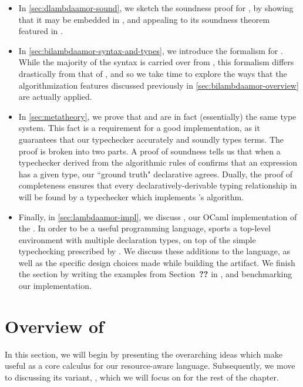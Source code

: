 \begin{itemize}
  \item In \autoref{sec:dlambdaamor-sound}, we sketch the soundness proof for \dlambdaamor, by showing that it may be embedded in \lambdaamor, and appealing to its soundness theorem featured in \citet{rajani-et-al:popl21}.
 
 \item In \autoref{sec:bilambdaamor-syntax-and-types}, we introduce the formalism for \bilambdaamor. While the majority of the syntax is carried over from \dlambdaamor, this formalism differs drastically from that of \dlambdaamor, and so we take time to explore the ways that the algorithmization features discussed previously in \autoref{sec:bilambdaamor-overview} are actually applied.
 
 \item In \autoref{sec:metatheory}, we prove that \bilambdaamor and \dlambdaamor are in fact (essentially) the same type system. This fact is a requirement for a good implementation, as it guarantees that our typechecker accurately and soundly types terms. The proof is broken into two parts. A proof of soundness tells us that when a typechecker derived from the algorithmic rules of \bilambdaamor confirms that an expression has a given type, our ``ground truth" declarative \dlambdaamor agrees. Dually, the proof of completeness ensures that every declaratively-derivable typing relationship in \dlambdaamor will be found by a typechecker which implements \bilambdaamor's algorithm.
 
 \item Finally, in \autoref{sec:lambdaamor-impl}, we discuss \lambdaamorimpl, our OCaml implementation of the \dlambdaamor. In order to be a useful programming language, \lambdaamorimpl sports a top-level environment with multiple declaration types, on top of the simple typechecking prescribed by \bilambdaamor. We discuss these additions to the language, as well as the specific design choices made while building the artifact. We finish the section by writing the examples from Section~\textbf{??} in \lambdaamorimpl, and benchmarking our implementation.
\end{itemize}


\section{Overview of \dlambdaamor} 
\label{sec:dlambdaamor-overview}
In this section, we will begin by presenting the overarching ideas which make \lambdaamor useful as a core calculus for our resource-aware language. Subsequently, we move to discussing its variant, \dlambdaamor, which we will focus on for the rest of the chapter.

